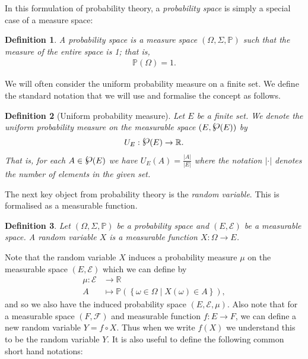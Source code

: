 \documentclass{article}
\newcommand{\powerset}{\raisebox{.15\baselineskip}{\Large\ensuremath{\wp}}}
\newcommand{\set}[2]{\left\{ #1 \middle| #2 \right\}}
\newtheorem{definition}{Definition}
\theoremstyle{remark}
\renewcommand{\P}{\mathbb{P}}
\begin{document}
In this formulation of probability theory, a \textit{probability space} is
simply a special case of a measure space:

\begin{definition}
	A probability space is a measure space $(\Omega, \Sigma, \P)$ such that the
	measure of the entire space is 1; that is,
	\begin{align*}
		\P(\Omega) = 1.
	\end{align*}
\end{definition}

We will often consider the uniform probability measure on a finite set. We
define the standard notation that we will use and formalise the concept as
follows.

\begin{definition}[Uniform probability measure]
	Let $E$ be a finite set. We denote the uniform probability measure on the
	measurable space $(E, \powerset(E))$ by
	\begin{align*}
		U_E: \powerset(E) \to \mathbb{R}.
	\end{align*}
	That is, for each $A \in \powerset(E)$ we have $U_E(A) = \frac{|A|}{|E|}$
	where the notation $|\cdot|$ denotes the number of elements in the given
	set.
\end{definition}

The next key object from probability theory is the \textit{random variable}.
This is formalised as a measurable function.

\begin{definition}
	Let $(\Omega, \Sigma, \P)$ be a probability space and $(E, \mathcal{E})$ be
	a measurable space. A random variable $X$ is a measurable function $X:
	\Omega \to E$.
\end{definition}

Note that the random variable $X$ induces a probability measure $\mu$ on the
measurable space $(E, \mathcal{E})$ which we can define by
\begin{align*}
	\mu: \mathcal{E} &\to \mathbb{R}\\
	A &\mapsto \P(\set{\omega \in \Omega}{X(\omega) \in A}),
\end{align*}
and so we also have the induced probability space $(E, \mathcal{E}, \mu)$. Also
note that for a measurable space $(F, \mathcal{F})$ and measurable function $f:
E \to F$, we can define a new random variable $Y = f \circ X$. Thus when we
write $f(X)$ we understand this to be the random variable $Y$. It is also
useful to define the following common short hand notations:
\end{document}
